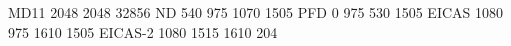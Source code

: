 MD11 2048 2048 32856
ND 540 975 1070 1505
PFD 0 975 530 1505
EICAS 1080 975 1610 1505
EICAS-2 1080 1515 1610 204
